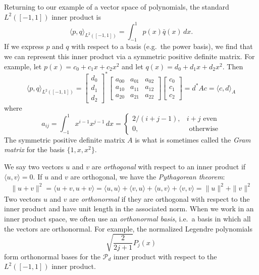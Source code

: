 \documentclass[12pt, leqno]{article} %
\begin{document}
Returning to our example of a vector space of polynomials,
the standard $L^2([-1,1])$ inner product is
\[
  \langle p, q \rangle_{L^2([-1,1])} = \int_{-1}^1 p(x) \bar{q}(x) \, dx.
\]
If we express $p$ and $q$ with respect to a basis (e.g.~the power
basis), we find that we can represent this inner product via a
symmetric positive definite matrix.  For example,
let $p(x) = c_0 + c_1 x + c_2 x^2$ and let
$q(x) = d_0 + d_1 x + d_2 x^2$.  Then
\[
  \langle p, q \rangle_{L^2([-1,1])} =
  \begin{bmatrix} d_0 \\ d_1 \\ d_2 \end{bmatrix}^*
  \begin{bmatrix}
    a_{00} & a_{01} & a_{02} \\
    a_{10} & a_{11} & a_{12} \\
    a_{20} & a_{21} & a_{22}
  \end{bmatrix}
  \begin{bmatrix} c_0 \\ c_1 \\ c_2 \end{bmatrix} =
  d^* A c = \langle c, d \rangle_A
\]
where
\[
a_{ij} = \int_{-1}^1 x^{i-1} x^{j-1} \, dx =
\begin{cases}
  2/(i+j-1), & i+j \mbox{ even} \\
  0, & \mbox{ otherwise}
\end{cases}
\]
The symmetric positive definite matrix $A$ is what is sometimes called
the {\em Gram matrix} for the basis $\{1, x, x^2\}$.

We say two vectors $u$ and $v$ are {\em orthogonal} with respect to an
inner product if $\langle u, v \rangle = 0$.  If $u$ and $v$ are
orthogonal, we have the {\em Pythagorean theorem}:
\begin{align*}
  \|u+v\|^2
  = \langle u + v, u + v \rangle
  = \langle u, u \rangle + \langle v, u \rangle + \langle u, v \rangle
  + \langle v, v \rangle
  = \|u\|^2 + \|v\|^2
\end{align*}
Two vectors $u$ and $v$ are {\em orthonormal} if they are orthogonal
with respect to the inner product and have unit length in the associated
norm.  When we work in an inner product space, we often use an
{\em orthonormal basis}, i.e.~a basis in which all the vectors are
orthonormal.  For example, the normalized Legendre polynomials
\[
  \sqrt{\frac{2}{2j+1}} P_j(x)
\]
form orthonormal bases for the $\mathcal{P}_d$ inner product with
respect to the $L^2([-1,1])$ inner product.
\end{document}

